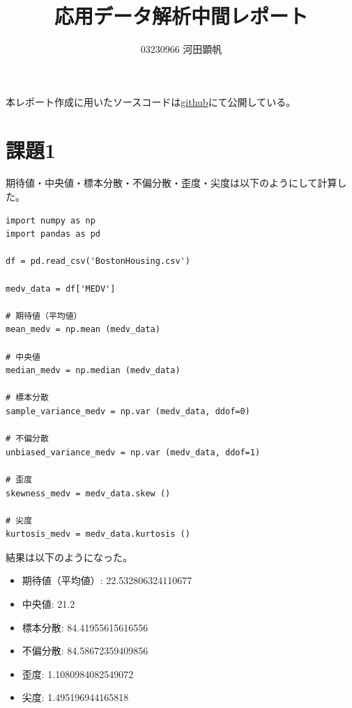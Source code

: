 \documentclass{jsarticle}
\begin{document}
\title{応用データ解析中間レポート}
\author{03230966 河田顕帆}
\maketitle

本レポート作成に用いたソースコードは\href{https://github.com/takeshiho0531/UTokyo-assignment/blob/bf90c0d5bb43624e2a78c65f54a0b9647537abd1/3A/applied_data_analysis/mid_report/%E5%BF%9C%E7%94%A8%E3%83%87%E3%83%BC%E3%82%BF%E8%A7%A3%E6%9E%90%E8%AA%B2%E9%A1%8C%E4%B8%AD%E9%96%93%E8%AA%B2%E9%A1%8C.ipynb}{github}にて公開している。\\

\section{課題1}
期待値・中央値・標本分散・不偏分散・歪度・尖度は以下のようにして計算した。\\

\begin{lstlisting}
import numpy as np
import pandas as pd

df = pd.read_csv('BostonHousing.csv')

medv_data = df['MEDV']

# 期待値（平均値）
mean_medv = np.mean (medv_data)

# 中央値
median_medv = np.median (medv_data)

# 標本分散
sample_variance_medv = np.var (medv_data, ddof=0)

# 不偏分散
unbiased_variance_medv = np.var (medv_data, ddof=1)

# 歪度
skewness_medv = medv_data.skew ()

# 尖度
kurtosis_medv = medv_data.kurtosis ()

\end{lstlisting}

結果は以下のようになった。
\begin{itemize}
  \item 期待値（平均値）: 22.532806324110677
  \item 中央値: 21.2
  \item 標本分散: 84.41955615616556
  \item 不偏分散: 84.58672359409856
  \item 歪度: 1.1080984082549072
  \item 尖度: 1.495196944165818
\end{itemize}
\end{document}
